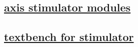 \documentclass{article}
\begin{document}
  


  \subsection{\href{../files/tm_stim_axis-v.html}{axis stimulator modules}}
  \subsection{\href{../files2/tb_axis-v.html}{textbench for stimulator}}
\end{document}
